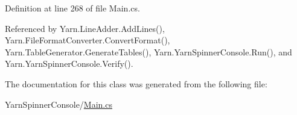 Definition at line 268 of file Main.\-cs.



Referenced by Yarn.\-Line\-Adder.\-Add\-Lines(), Yarn.\-File\-Format\-Converter.\-Convert\-Format(), Yarn.\-Table\-Generator.\-Generate\-Tables(), Yarn.\-Yarn\-Spinner\-Console.\-Run(), and Yarn.\-Yarn\-Spinner\-Console.\-Verify().



The documentation for this class was generated from the following file\-:\begin{DoxyCompactItemize}
\item 
Yarn\-Spinner\-Console/\hyperlink{a00300}{Main.\-cs}\end{DoxyCompactItemize}
